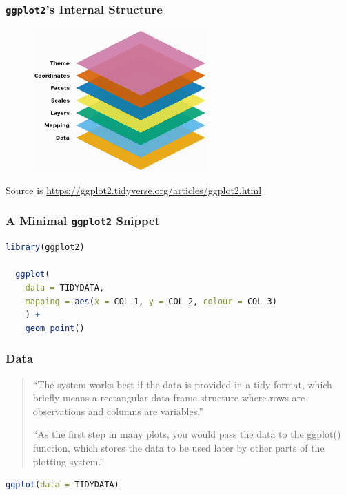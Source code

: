 \documentclass[aspectratio=1610]{beamer}
\begin{document}
\begin{frame}
	\frametitle{\texttt{ggplot2}'s Internal Structure}
	\begin{figure}
		\begin{center}
			\includegraphics[width=0.6\textwidth]{figures/ggplot2_structure}
		\end{center}
	\end{figure}
	Source is \url{https://ggplot2.tidyverse.org/articles/ggplot2.html}
\end{frame}

\begin{frame}[fragile]
	\frametitle{A Minimal \texttt{ggplot2} Snippet}
	\begin{lstlisting}[language=R]
  library(ggplot2)

  ggplot(
    data = TIDYDATA,
    mapping = aes(x = COL_1, y = COL_2, colour = COL_3)
    ) +
    geom_point()
  \end{lstlisting}

\end{frame}

\begin{frame}[fragile]
	\frametitle{Data}
	\begin{quote}
		``The system works best if the data is provided in a tidy format, which
		briefly means a rectangular data frame structure where rows are observations
		and columns are variables.''

		\vspace{2em}

		``As the first step in many plots, you would pass the data to the ggplot()
		function, which stores the data to be used later by other parts of the
		plotting system.''

	\end{quote}

	\vspace{2em}

	\begin{lstlisting}[language=R]
  ggplot(data = TIDYDATA)
  \end{lstlisting}

\end{frame}
\end{document}
